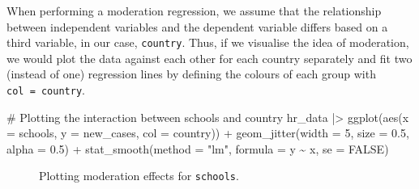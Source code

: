 \documentclass[
  letterpaper,
]{krantz}
\makeatletter
\newenvironment{Shaded}{\begin{snugshade}}{\end{snugshade}}
\newcommand{\AttributeTok}[1]{\textcolor[rgb]{0.40,0.45,0.13}{#1}}
\newcommand{\CommentTok}[1]{\textcolor[rgb]{0.37,0.37,0.37}{#1}}
\newcommand{\ConstantTok}[1]{\textcolor[rgb]{0.56,0.35,0.01}{#1}}
\newcommand{\DecValTok}[1]{\textcolor[rgb]{0.68,0.00,0.00}{#1}}
\newcommand{\FloatTok}[1]{\textcolor[rgb]{0.68,0.00,0.00}{#1}}
\newcommand{\FunctionTok}[1]{\textcolor[rgb]{0.28,0.35,0.67}{#1}}
\newcommand{\NormalTok}[1]{\textcolor[rgb]{0.00,0.23,0.31}{#1}}
\newcommand{\SpecialCharTok}[1]{\textcolor[rgb]{0.37,0.37,0.37}{#1}}
\newcommand{\StringTok}[1]{\textcolor[rgb]{0.13,0.47,0.30}{#1}}
\newenvironment{kframe}{%
\medskip{}
\setlength{\fboxsep}{.8em}
 \def\at@end@of@kframe{}%
 \ifinner\ifhmode%
  \def\at@end@of@kframe{\end{minipage}}%
  \begin{minipage}{\columnwidth}%
 \fi\fi%
 \def\FrameCommand##1{\hskip\@totalleftmargin \hskip-\fboxsep
 \colorbox{shadecolor}{##1}\hskip-\fboxsep
     \hskip-\linewidth \hskip-\@totalleftmargin \hskip\columnwidth}%
 \MakeFramed {\advance\hsize-\width
   \@totalleftmargin\z@ \linewidth\hsize
   \@setminipage}}%
 {\par\unskip\endMakeFramed%
 \at@end@of@kframe}
\renewenvironment{Shaded}{\begin{kframe}}{\end{kframe}}
\makeatother
\begin{document}
When performing a moderation regression, we assume that the relationship
between independent variables and the dependent variable differs based
on a third variable, in our case, \texttt{country}. Thus, if we
visualise the idea of moderation, we would plot the data against each
other for each country separately and fit two (instead of one)
regression lines by defining the colours of each group with
\texttt{col\ =\ country}.

\begin{Shaded}
\begin{Highlighting}[]
\CommentTok{\# Plotting the interaction between schools and country}
\NormalTok{hr\_data }\SpecialCharTok{|\textgreater{}}
  \FunctionTok{ggplot}\NormalTok{(}\FunctionTok{aes}\NormalTok{(}\AttributeTok{x =}\NormalTok{ schools,}
             \AttributeTok{y =}\NormalTok{ new\_cases,}
             \AttributeTok{col =}\NormalTok{ country)) }\SpecialCharTok{+}
  \FunctionTok{geom\_jitter}\NormalTok{(}\AttributeTok{width =} \DecValTok{5}\NormalTok{,}
              \AttributeTok{size =} \FloatTok{0.5}\NormalTok{,}
              \AttributeTok{alpha =} \FloatTok{0.5}\NormalTok{) }\SpecialCharTok{+}
  \FunctionTok{stat\_smooth}\NormalTok{(}\AttributeTok{method =} \StringTok{"lm"}\NormalTok{,}
              \AttributeTok{formula =}\NormalTok{ y }\SpecialCharTok{\textasciitilde{}}\NormalTok{ x,}
              \AttributeTok{se =} \ConstantTok{FALSE}\NormalTok{)}
\end{Highlighting}
\end{Shaded}

\begin{figure}[H]


\caption{\label{fig-plotting-moderation-effects-schools}Plotting
moderation effects for \texttt{schools}.}

\end{figure}%
\end{document}
